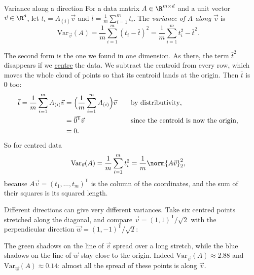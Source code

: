 \documentclass[a4paper,12pt,oneside]{report}
\begin{document}
\begin{frameddefn}{Variance along a direction}
\label{def:variance-direction}
For a data matrix $A\in\R^{m\times d}$ and a unit vector
$\vec v\in\R^d$, let $t_i=A_{(i)}\vec v$ and
$\bar t=\frac1m\sum_{i=1}^{m}t_i$. The
\emph{variance of $A$ along $\vec v$} is
\[
  \mathrm{Var}_{\vec v}(A)=\frac1m\sum_{i=1}^{m}(t_i-\bar t)^2
  =\frac1m\sum_{i=1}^{m}t_i^2-\bar t^2 .
\]
\end{frameddefn}

The second form is the one we
\hyperref[eq:variance-mean-squares]{found in one dimension}. As there, the
term $\bar t^2$ disappears if we \hyperref[sec:centring]{centre} the data. We subtract the
centroid from every row, which moves the whole cloud of points so
that its centroid lands at the origin. Then $\bar t$ is $0$ too:
\[
\begin{aligned}
  \bar t=\frac1m\sum_{i=1}^{m}A_{(i)}\vec v
    &=\Bigl(\frac1m\sum_{i=1}^{m}A_{(i)}\Bigr)\vec v
      &&\quad\text{by distributivity},\\
    &=\vec 0^{\mathsf T}\vec v
      &&\quad\text{since the centroid is now the origin},\\
    &=0 .
\end{aligned}
\]
So for centred data
\[
  \mathrm{Var}_{\vec v}(A)
  =\frac1m\sum_{i=1}^{m}t_i^2
  =\frac1m\norm{A\vec v}_2^2,
\]
because $A\vec v=(t_1,\ldots,t_m)^{\mathsf T}$ is the column of the
coordinates, and the sum of their squares is its squared length.

Different directions can give very different variances. Take six
centred points stretched along the diagonal, and compare
$\vec v=(1,1)^{\mathsf T}/\sqrt2$ with the perpendicular direction
$\vec w=(1,-1)^{\mathsf T}/\sqrt2$:
\begin{center}
\end{center}
The green shadows on the line of $\vec v$ spread over a long stretch,
while the blue shadows on the line of $\vec w$ stay close to the
origin. Indeed $\mathrm{Var}_{\vec v}(A)\approx2.88$ and
$\mathrm{Var}_{\vec w}(A)\approx0.14$: almost all the spread of
these points is along $\vec v$.
\end{document}
